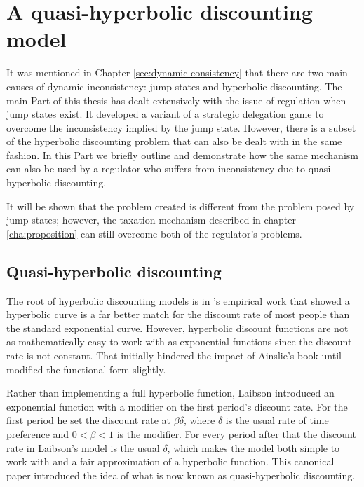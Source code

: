 
\chapter{A quasi-hyperbolic discounting model}
\label{cha:model}

It was mentioned in Chapter \ref{sec:dynamic-consistency} that there
are two main causes of dynamic inconsistency: jump states and
hyperbolic discounting. The main Part of this thesis has dealt
extensively with the issue of regulation when jump states exist. It
developed a variant of a strategic delegation game to overcome the
inconsistency implied by the jump state. However, there is a subset of
the hyperbolic discounting problem that can also be dealt with in the
same fashion. In this Part we briefly outline and demonstrate how the
same mechanism can also be used by a regulator who suffers from
inconsistency due to quasi-hyperbolic discounting.

It will be shown that the problem created is different from the
problem posed by jump states; however, the taxation mechanism
described in chapter \ref{cha:proposition} can still overcome both of
the regulator's problems.

\section{Quasi-hyperbolic discounting}
\label{sec:quasi-hyperb-disc}

The root of hyperbolic discounting models is in \citet{Ainslie1992}'s
empirical work that showed a hyperbolic curve is a far better match
for the discount rate of most people than the standard exponential
curve. However, hyperbolic discount functions are not as mathematically
easy to work with as exponential functions since the discount rate is
not constant. That initially hindered the impact of Ainslie's book
until \citet{Laibson1997} modified the functional form slightly.

Rather than implementing a full hyperbolic function, Laibson
introduced an exponential function with a modifier on the first
period's discount rate. For the first period he set the discount rate
at $\beta\delta$, where $\delta$ is the usual rate of time preference
and $0 < \beta < 1$ is the modifier. For every period after that the
discount rate in Laibson's model is the usual $\delta$, which makes
the model both simple to work with and a fair approximation of a
hyperbolic function. This canonical paper introduced the idea of what
is now known as quasi-hyperbolic discounting.

